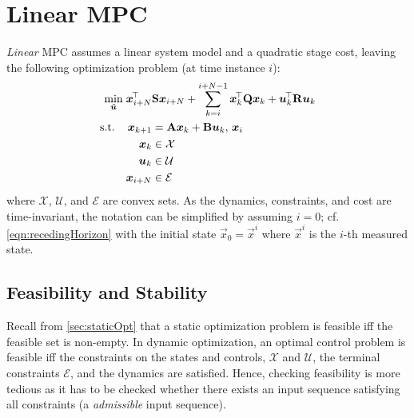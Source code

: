 	\section{Linear MPC}
		\emph{Linear} MPC assumes a linear system model and a quadratic stage cost, leaving the following optimization problem (at time instance \(i\)):
		\begin{equation}
			\begin{aligned}
				\min_{\tilde{\bm{u}}}\; & \bm{x}_{i + N}^{\!\top} \bm{\mathrm{S}} \bm{x}_{i + N} + \sum_{k = i}^{i + N - 1} \bm{x}_k^{\!\top} \bm{\mathrm{Q}} \bm{x}_k + \bm{u}_k^{\!\top} \bm{\mathrm{R}} \bm{u}_k \\
				\text{s.t.}\quad         &
				\begin{aligned}[t]
					\bm{x}_{k + 1} & = \bm{\mathrm{A}} \bm{x}_k + \bm{\mathrm{B}} \bm{u}_k,\, \bm{x}_i \\
					\bm{x}_k       & \in \mathcal{X}                                      \\
					\bm{u}_k       & \in \mathcal{U}                                      \\
					\bm{x}_{i + N} & \in \mathcal{E}
				\end{aligned}
			\end{aligned}
			\label{eqn:linearRecedingHorizon}
		\end{equation}
		where \(\mathcal{X}\), \(\mathcal{U}\), and \(\mathcal{E}\) are convex sets. As the dynamics, constraints, and cost are time-invariant, the notation can be simplified by assuming \(i = 0\); cf. \eqref{eqn:recedingHorizon} with the initial state \(\vec{x}_0 = \vec{x}^i\) where \(\vec{x}^i\) is the \(i\)-th measured state.

		\subsection{Feasibility and Stability}
			Recall from \autoref{sec:staticOpt} that a static optimization problem is feasible iff the feasible set is non-empty. In dynamic optimization, an optimal control problem is feasible iff the constraints on the states and controls, \(\mathcal{X}\) and \(\mathcal{U}\), the terminal constraints \(\mathcal{E}\), and the dynamics are satisfied. Hence, checking feasibility is more tedious as it has to be checked whether there exists an input sequence satisfying all constraints (a \emph{admissible} input sequence).

